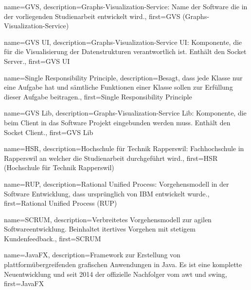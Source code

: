 



{
	name={GVS},
	description={Graphs-Visualization-Service: Name der Software die in der vorliegenden Studienarbeit entwickelt wird.},
	first={GVS (Graphs-Visualization-Service)}
}

{
	name={GVS UI},
	description={Graphs-Visualization-Service UI: Komponente, die für die Visualisierung der Datenstrukturen verantwortlich ist. Enthält den Socket Server.},
	first={GVS UI}
}

{
	name={Single Responsibility Principle},
	description={Besagt, dass jede Klasse nur eine Aufgabe hat und sämtliche Funktionen einer Klasse sollen zur Erfüllung dieser Aufgabe beitragen.},
	first={Single Responsibility Principle}
}

{
	name={GVS Lib},
	description={Graphs-Visualization-Service Lib: Komponente, die beim Client in das Software Projekt eingebunden werden muss. Enthält den Socket Client.},
	first={GVS Lib}
}


{
	name={HSR},
	description={Hochschule für Technik Rapperswil: Fachhochschule in Rapperswil an welcher die Studienarbeit durchgeführt wird.},
	first={HSR (Hochschule für Technik Rapperswil)}
}

{
	name={RUP},
	description={Rational Unified Process: Vorgehensmodell in der Software Entwicklung, dass ursprünglich von IBM entwickelt wurde.},
	first={Rational Unified Process (RUP)}
}

{
	name={SCRUM},
	description={Verbreitetes Vorgehensmodell zur agilen Softwareentwicklung. Beinhaltet itertives Vorgehen mit stetigem Kundenfeedback.},
	first={SCRUM}
}

{
	name={JavaFX},
	description={Framework zur Erstellung von plattformübergreifenden grafischen Anwendungen in Java. Es ist eine komplette Neuentwicklung und seit 2014 der offizielle Nachfolger vom \gls{awt} und \gls{swing}},
	first={JavaFX}
}

